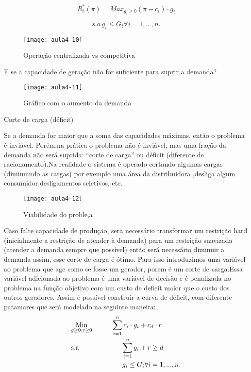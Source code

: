 \[
R_{i}^{*}(\pi)=Max_{g_{i}\geq0}(\pi-c_{i})\cdot g_{i}
\]


\[
s.a \, g_{i}\leq G_{i}\forall i=1,...,n.
\]

\begin{figure}[H]
\begin{centering}
\texttt{[image: aula4-10]}\protect\caption{\label{fig:aula4-10} Operação centralizada vs competitiva}
\end{centering}
\end{figure}
E se a capacidade de geração não for suficiente para suprir a demanda?
\begin{figure}[H]
\begin{centering}
\texttt{[image: aula4-11]}\protect\caption{\label{fig:aula4-11} Gráfico com o aumento da demanda}
\end{centering}
\end{figure}
Corte de carga (déficit)

Se a demanda for maior que a soma das capacidades máximas, então o
problema é inviável. Porém,na prática o problema não é inviável, mas uma fração da demanda não será suprida: ``corte de carga'' ou déficit (diferente de racionamento).Na realidade o sistema é operado cortando algumas cargas (diminuindo as cargas) por exemplo uma área da distribuidora ,desliga algum consumidor,desligamentos seletivos, etc.
\begin{figure}[H]
\begin{centering}
\texttt{[image: aula4-12]}\protect\caption{\label{fig:aula4-12} Viabilidade do proble,a }
\end{centering}
\end{figure}
Caso falte capacidade de produção, sera necessário transformar um restrição hard (inicialmente a restrição de atender à demanda) para um restrição suavizada (atender a demanda sempre que possível) então será necessário diminuir a demanda assim, esse corte de carga é ótimo. 
Para isso introduzimos uma variável ao problema que age como se
fosse um gerador, porem é um corte de carga.Essa variável adicionada ao problema  é uma variável de decisão e é penalizada no problema na função objetivo com um custo de deficit maior que o custo dos outros geradores.
Assim é possível construir a curva de déficit, com diferente patamares
que será modelado na seguinte maneira:
\begin{align}
    & \underset{g\geq0, r\geq0}{\text{Min}} \hspace{1cm} \sum_{i=1}^{n}c_{i}\cdot g_{i} + c_{d}\cdot r \label{eq15} \\
    & \text{s.a}  \hspace{2.2cm} \sum_{i=1}^{n}g_{i} + r\geq d \label{eq16} \\
    &             \hspace{2.65cm}g_{i}\leq G_{i} \forall i=1,...,n.\label{eq17}
\end{align}

